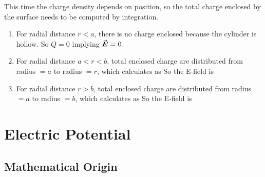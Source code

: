 \documentclass[class=article, crop=false, 12pt]{standalone}
\begin{document}
\begin{example}

    This time the charge density depends on position,
    so the total charge enclosed by the surface needs to be computed by integration.

    \begin{enumerate}
        \item For radial distance $r<a$, there is no charge enclosed because the cylinder is hollow.
        So $Q=0$ implying $\va*{E}=0$.


        \item For radial distance $a<r<b$, 
        total enclosed charge are distributed from radius $=a$ to radius $=r$,
        which calculates as
        So the E-field is
        

        \item For radial distance $r>b$,
        total enclosed charge are distributed from radius $=a$ to radius $=b$,
        which calculates as
        So the E-field is


    \end{enumerate}

\end{example}



\linesep
\section{Electric Potential}

\subsection{Mathematical Origin}
\end{document}

